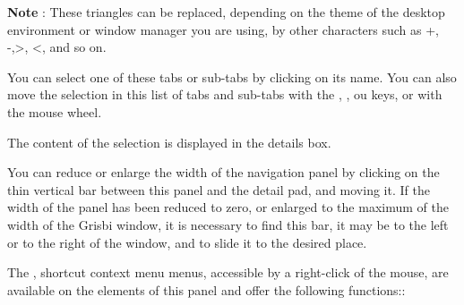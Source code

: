 \textbf{Note} : These triangles can be replaced, depending on the theme of the desktop environment or window manager you are using, by other characters such as +, -,>, <, and so on.


You can select one of these tabs or sub-tabs by clicking on its name. You can also move the selection in this list of tabs and sub-tabs with the , ,  ou  keys, or with the mouse wheel. 

The content of the selection is displayed in the details box.

You can reduce or enlarge the width of the navigation panel by clicking on the thin vertical bar between this panel and the detail pad, and moving it. If the width of the panel has been reduced to zero, or enlarged to the maximum of the width of the Grisbi window, it is necessary to find this bar, it may be to the left or to the right of the window, and to slide it to the desired place.


The , shortcut context menu menus, accessible by a right-click of the mouse, are available on the elements of this panel and offer the following functions::

